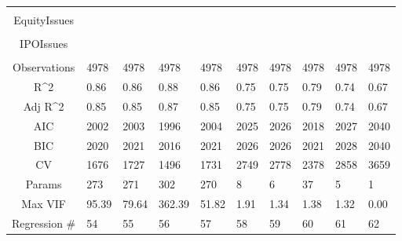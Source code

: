 \documentclass{article}
\begin{document}
\begin{table}[H]
\begin{tabular}{|clllllllll|}
   &  &  &  &  &  &  &  &  &  \\ 
  EquityIssues &  &  &  &  &  &  &  &  &  \\ 
   &  &  &  &  &  &  &  &  &  \\ 
  IPOIssues &  &  &  &  &  &  &  &  &  \\ 
   &  &  &  &  &  &  &  &  &  \\ 
  \hline 
 Observations & 4978 & 4978 & 4978 & 4978 & 4978 & 4978 & 4978 & 4978 & 4978 \\ 
  R^2 & 0.86 & 0.86 & 0.88 & 0.86 & 0.75 & 0.75 & 0.79 & 0.74 & 0.67 \\ 
  Adj R^2 & 0.85 & 0.85 & 0.87 & 0.85 & 0.75 & 0.75 & 0.79 & 0.74 & 0.67 \\ 
  AIC & 2002 & 2003 & 1996 & 2004 & 2025 & 2026 & 2018 & 2027 & 2040 \\ 
  BIC & 2020 & 2021 & 2016 & 2021 & 2026 & 2026 & 2021 & 2028 & 2040 \\ 
  CV & 1676 & 1727 & 1496 & 1731 & 2749 & 2778 & 2378 & 2858 & 3659 \\ 
  Params & 273 & 271 & 302 & 270 & 8 & 6 & 37 & 5 & 1 \\ 
  Max VIF & 95.39 & 79.64 & 362.39 & 51.82 & 1.91 & 1.34 & 1.38 & 1.32 & 0.00 \\ 
  Regression \# & 54 & 55 & 56 & 57 & 58 & 59 & 60 & 61 & 62 \\ 
   \hline
\end{tabular}
 
\end{table}
\end{document}
